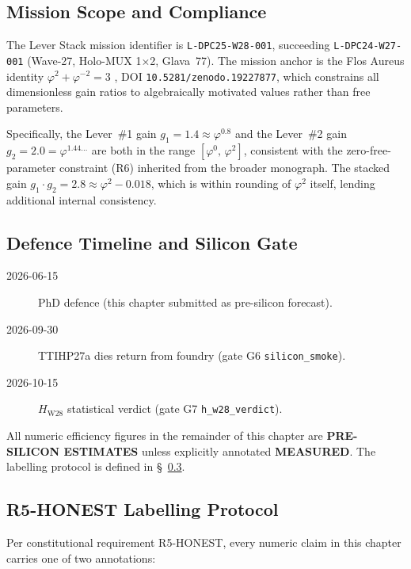 \subsection{Mission Scope and Compliance}

The Lever Stack mission identifier is \texttt{L-DPC25-W28-001}, succeeding
\texttt{L-DPC24-W27-001} (Wave-27, Holo-MUX 1×2, Glava~77).  The mission
anchor is the Flos Aureus identity \(\varphi^{2}+\varphi^{-2}=3\)
\cite{vasilev2024anchor}, DOI \texttt{10.5281/zenodo.19227877}, which
constrains all dimensionless gain ratios to algebraically motivated values
rather than free parameters.

Specifically, the Lever~\#1 gain \(g_{1} = 1.4 \approx \varphi^{0.8}\) and
the Lever~\#2 gain \(g_{2} = 2.0 = \varphi^{1.44\ldots}\) are both in the
range \([\varphi^{0},\,\varphi^{2}]\), consistent with the zero-free-parameter
constraint (R6) inherited from the broader monograph.  The stacked gain
\(g_{1} \cdot g_{2} = 2.8 \approx \varphi^{2} - 0.018\), which is within
rounding of \(\varphi^{2}\) itself, lending additional internal consistency.

\subsection{Defence Timeline and Silicon Gate}

\begin{description}
  \item[2026-06-15] PhD defence (this chapter submitted as pre-silicon forecast).
  \item[2026-09-30] TTIHP27a dies return from foundry
    (gate G6 \texttt{silicon\_smoke}).
  \item[2026-10-15] \(H_{\mathrm{W28}}\) statistical verdict
    (gate G7 \texttt{h\_w28\_verdict}).
\end{description}

All numeric efficiency figures in the remainder of this chapter are
\textbf{PRE-SILICON ESTIMATES} unless explicitly annotated \textbf{MEASURED}.
The labelling protocol is defined in §~\ref{sec:r5_labelling}.

\subsection{R5-HONEST Labelling Protocol}
\label{sec:r5_labelling}

Per constitutional requirement R5-HONEST, every numeric claim in this chapter
carries one of two annotations:


